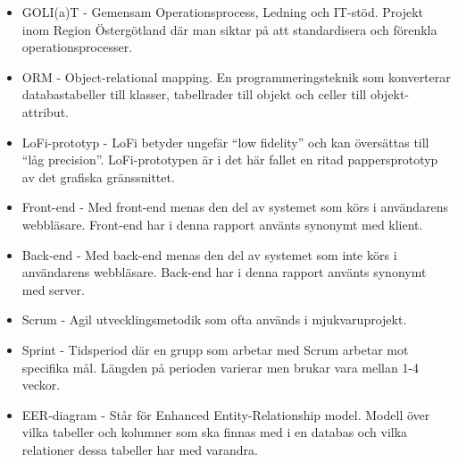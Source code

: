 \begin{itemize}

\item GOLI(a)T - Gemensam Operationsprocess, Ledning och IT-stöd. Projekt inom Region Östergötland där man siktar på att standardisera och förenkla operationsprocesser.

\item ORM - Object-relational mapping. En programmeringsteknik som konverterar databastabeller till klasser, tabellrader till objekt och celler till objekt-attribut.

\item LoFi-prototyp - LoFi betyder ungefär ``low fidelity'' och kan översättas till ``låg precision''. LoFi-prototypen är i det här fallet en ritad pappersprototyp av det grafiska gränssnittet.

\item Front-end - Med front-end menas den del av systemet som körs i användarens webbläsare. Front-end har i denna rapport använts synonymt med klient.

\item Back-end - Med back-end menas den del av systemet som inte körs i användarens webbläsare. Back-end har i denna rapport använts synonymt med server. 

\item Scrum - Agil utvecklingsmetodik som ofta används i mjukvaruprojekt.

\item Sprint - Tidsperiod där en grupp som arbetar med Scrum arbetar mot specifika mål. Längden på perioden varierar men brukar vara mellan 1-4 veckor.

\item EER-diagram - Står för Enhanced Entity-Relationship model. Modell över vilka tabeller och kolumner som ska finnas med i en databas och vilka relationer dessa tabeller har med varandra.

\end{itemize}

\newpage
